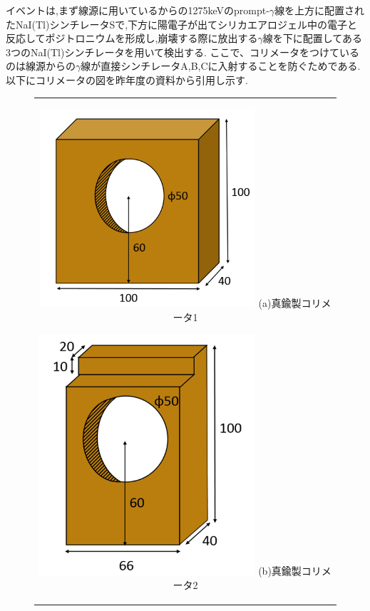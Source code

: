 イベントは,まず線源に用いているからの1275keVのprompt-$\gamma$線を上方に配置されたNaI(Tl)シンチレータSで,下方に陽電子が出てシリカエアロジェル中の電子と反応してポジトロニウムを形成し,崩壊する際に放出する$\gamma$線を下に配置してある3つのNaI(Tl)シンチレータを用いて検出する.
ここで、コリメータをつけているのは線源からの$\gamma$線が直接シンチレータA,B,Cに入射することを防ぐためである.
以下にコリメータの図を昨年度の資料から引用し示す.
\begin{figure}[H]
	\centering
		\begin{tabular}{c}
			\begin{minipage}{0.5\hsize}
				\centering
					\includegraphics[width=80mm]{fig/isb/collimator1.png}
					\hspace{1.6cm} (a)真鍮製コリメータ1
			\end{minipage}
			\begin{minipage}{0.5\hsize}
				\centering
					\includegraphics[width=80mm]{fig/isb/collimator2.png}
					\hspace{1.6cm} (b)真鍮製コリメータ2
			\end{minipage}
		\end{tabular}
\end{figure}
